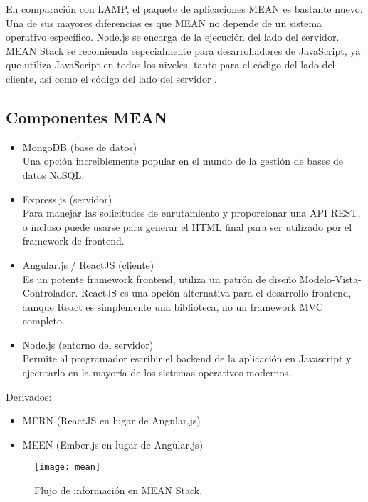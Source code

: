 En comparación con LAMP, el paquete de aplicaciones MEAN es bastante nuevo. Una de sus mayores diferencias es que MEAN no depende de un sistema operativo específico. Node.js se encarga de la ejecución del lado del servidor. MEAN Stack se recomienda especialmente para desarrolladores de JavaScript, ya que utiliza JavaScript en todos los niveles, tanto para el código del lado del cliente, así como el código del lado del servidor \cite{srinivasan}.
\vspace{0.8cm}

\subsection{Componentes MEAN}
\begin{itemize}
  \item MongoDB (base de datos)\\
  Una opción increíblemente popular en el mundo de la gestión de bases de datos NoSQL.
  \item Express.js (servidor)\\
  Para manejar las solicitudes de enrutamiento y proporcionar una API REST, o incluso puede usarse para generar el HTML final para ser utilizado por el \gls{framework} de \gls{frontend}.
  \item Angular.js / ReactJS (cliente)\\
  Es un potente \gls{framework} \gls{frontend}, utiliza un patrón de diseño Modelo-Vista-Controlador. ReactJS es una opción alternativa para el desarrollo \gls{frontend}, aunque React es simplemente una biblioteca, no un \gls{framework} MVC completo.
  \item Node.js (entorno del servidor)\\
  Permite al programador escribir el \gls{backend} de la aplicación en Javascript y ejecutarlo en la mayoría de los sistemas operativos modernos.
\end{itemize}

Derivados:

\begin{itemize}
  \item MERN (ReactJS en lugar de Angular.js)
  \item MEEN (Ember.js en lugar de Angular.js)
\end{itemize} 

\begin{figure}[H]
  \centering
  \texttt{[image: mean]}
  \caption{Flujo de información en MEAN Stack.}
\end{figure}

